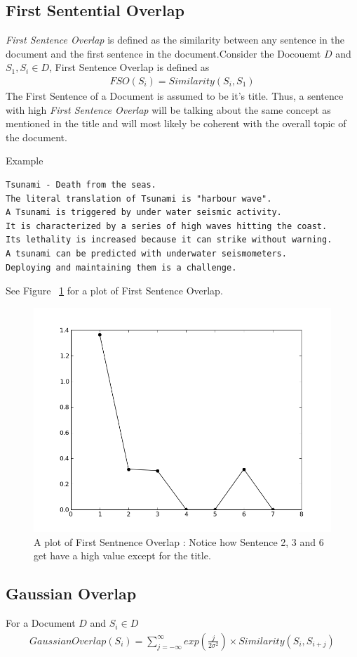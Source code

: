 \documentclass[paper=a4, fontsize=11pt]{scrartcl} %
\numberwithin{equation}{section} %
\numberwithin{figure}{section} %
\numberwithin{table}{section} %
\begin{document}
\subsection{First Sentential Overlap}
\emph{First Sentence Overlap} \cite{mead} is defined as the similarity between any sentence in the document and the first sentence in the document.Consider the Docouemt $D$ and $S_1,S_i \in D $, First Sentence Overlap is defined as 
\begin{align}
FSO(S_i) = Similarity(S_i,S_1)
\end{align} 
The First Sentence of a Document is assumed to be it's title. Thus, a sentence with high \emph{First Sentence Overlap} will be talking about the same concept as mentioned in the title and will most likely be coherent with the overall topic of the document.\\
\par
{\large Example}
\begin{lstlisting}
Tsunami - Death from the seas.
The literal translation of Tsunami is "harbour wave".
A Tsunami is triggered by under water seismic activity.
It is characterized by a series of high waves hitting the coast.
Its lethality is increased because it can strike without warning.
A tsunami can be predicted with underwater seismometers.
Deploying and maintaining them is a challenge.
\end{lstlisting}
See Figure ~\ref{fig:fso} for a plot of First Sentence Overlap.

\begin{figure}[h!]
  \centering
    \includegraphics[width=.8\textwidth]{images/fso}
    \caption{A plot of First Sentnence Overlap : Notice how Sentence 2, 3 and 6 get have a high value except for the title.}
    \label{fig:fso}
\end{figure}


\subsection{Gaussian Overlap}
For a Document $D$ and $S_i \in D$
\begin{align}
GaussianOverlap(S_i) =\sum\limits_{j = - \infty}^{\infty} exp \left( \frac{j}{2\sigma^2} \right) \times Similarity(S_i,S_{i+j})
\end{align}
\pagebreak
{}

\end{document}
